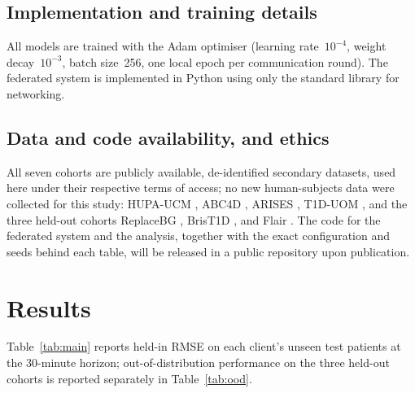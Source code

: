 \documentclass[10pt,letterpaper]{article}
\begin{document}
\subsection*{Implementation and training details}

All models are trained with the Adam optimiser (learning rate~$10^{-4}$, weight
decay~$10^{-3}$, batch size~256, one local epoch per communication round). The
federated system is implemented in Python using only the standard library for
networking.

\subsection*{Data and code availability, and ethics}

All seven cohorts are publicly available, de-identified secondary datasets, used
here under their respective terms of access; no new human-subjects data were
collected for this study: HUPA-UCM \cite{hidalgo2024hupaucm}, ABC4D
\cite{abc4d_nct}, ARISES \cite{zhu2022arises}, T1D-UOM \cite{alsuhaymi2025t1duom},
and the three held-out cohorts ReplaceBG \cite{aleppo2017replacebg}, BrisT1D
\cite{james2025brist1d}, and Flair \cite{jaeb_flair}. The code for the federated
system and the analysis, together with the exact configuration and seeds behind
each table, will be released in a public repository upon publication.

\section*{Results}

Table~\ref{tab:main} reports held-in RMSE on each client's unseen test patients at
the 30-minute horizon; out-of-distribution performance on
the three held-out cohorts is reported separately in Table~\ref{tab:ood}.
\end{document}
